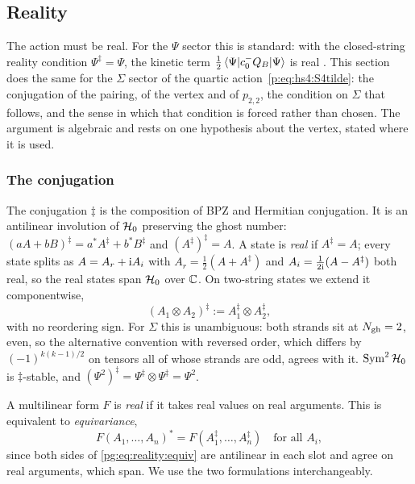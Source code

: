 \subsection{Reality}
\label{pg:sec:reality}

The action must be real.
For the $\Psi$ sector this is standard: with the closed-string reality condition $\Psi^\ddagger=\Psi$, the kinetic term $\frac12\braket{\Psi|c_0^-Q_B|\Psi}$ is real \cite{Erbin:2021:StringFieldTheory}.
This section does the same for the $\Sigma$ sector of the quartic action~\eqref{p:eq:hs4:S4tilde}: the conjugation of the pairing, of the vertex and of $p_{2,2}$, the condition on $\Sigma$ that follows, and the sense in which that condition is forced rather than chosen.
The argument is algebraic and rests on one hypothesis about the vertex, stated where it is used.

\subsubsection{The conjugation}
\label{pg:sec:reality:conj}

The conjugation $\ddagger$ is the composition of BPZ and Hermitian conjugation.
It is an antilinear involution of ${\mathcal{H}}_0$ preserving the ghost number: $(aA+bB)^\ddagger=a^*A^\ddagger+b^*B^\ddagger$ and $(A^\ddagger)^\ddagger=A$.
A state is \emph{real} if $A^\ddagger=A$; every state splits as $A=A_r+\mathrm{i} A_i$ with $A_r=\frac12(A+A^\ddagger)$ and $A_i=\frac1{2\mathrm{i}}(A-A^\ddagger)$ both real, so the real states span ${\mathcal{H}}_0$ over $\mathbb{C}$.
On two-string states we extend it componentwise,
\begin{equation}
  (A_1 \otimes A_2)^\ddagger
    := A_1^\ddagger \otimes A_2^\ddagger,
\end{equation}
with no reordering sign.
For $\Sigma$ this is unambiguous: both strands sit at $N_{\rm gh}=2$, even, so the alternative convention with reversed order, which differs by $(-1)^{k(k-1)/2}$ on tensors all of whose strands are odd, agrees with it.
$\operatorname{Sym}^2{\mathcal{H}}_0$ is $\ddagger$-stable, and $(\Psi^2)^\ddagger=\Psi^\ddagger\otimes\Psi^\ddagger=\Psi^2$.

A multilinear form $F$ is \emph{real} if it takes real values on real arguments.
This is equivalent to \emph{equivariance},
\begin{equation}
  \label{pg:eq:reality:equiv}
  F(A_1, \ldots, A_n)^*
    = F(A_1^\ddagger, \ldots, A_n^\ddagger)
  \quad\text{for all } A_i ,
\end{equation}
since both sides of \eqref{pg:eq:reality:equiv} are antilinear in each slot and agree on real arguments, which span.
We use the two formulations interchangeably.

